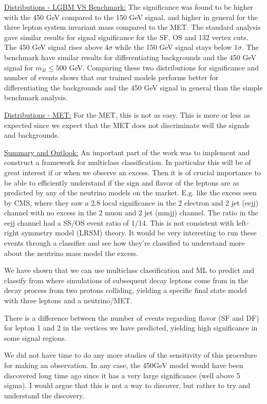 \documentclass[a4paper, american, 12pt]{report}
\begin{document}
	
	\underline{Distributions - LGBM VS Benchmark:}
	The significance was found to be higher with the 450 GeV compared to the 150 GeV signal, and higher in general for the three lepton system invariant mass compared to the MET. The standard analysis gave similar results for signal significance for the SF, OS and 132 vertex cuts. The 450 GeV signal rises above 4$\sigma$ while the 150 GeV signal stays below 1$\sigma$. The benchmark have similar results for differentiating backgrounds and the 450 GeV signal for $m_{3l}\leq500$ GeV. Comparing these two distributions for significance and number of events shows that our trained models performs better for differentiating the backgrounds and the 450 GeV signal in general than the simple benchmark analysis.
	
	
	\underline{Distributions - MET:}
	For the MET, this is not as easy. This is more or less as expected since we expect that the MET does not discriminate well the signals and backgrounds.
	
	
	\underline{Summary and Outlook:}
	An important part of the work was to implement and construct a framework for multiclass classification. In particular this will be of great interest if or when we observe an excess. Then it is of crucial importance to be able to efficiently understand if the sign and flavor of the leptons are as predicted by any of the neutrino models on the market. E.g. like the excess seen by CMS, where they saw a 2.8 local significance in the 2 electron and 2 jet (eejj) channel with no excess in the 2 muon and 2 jet (mmjj) channel.  The ratio in the eejj channel had a SS/OS event ratio of 1/14.  This is not consistent with left-right symmetry model (LRSM) theory. It would be very interesting to run these events through a classifier and see how they're classified to understand more about the neutrino mass model the excess. 
	
	We have shown that we can use multiclass classification and ML to predict and classify from where simulations of subsequent decay leptons come from in the decay process from two protons colliding, yielding a specific final state model with three leptons and a neutrino/MET.
	
	There is a difference between the number of events regarding flavor (SF and DF) for lepton 1 and 2 in the vertices we have predicted, yielding high significance in some signal regions. 
	
	We did not have time to do any more studies of the sensitivity of this procedure for making an observation. In any case, the 450GeV model would have been discovered long time ago since it has a very large significance (well above 5 sigma). I would argue that this is not a way to discover, but rather to try and understand the discovery.
	
\end{document}
